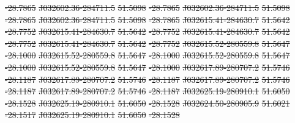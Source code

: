 \documentclass[11pt, a4paper]{book}
\providecommand{\DIFdeltex}[1]{{\protect\color{red}\sout{#1}}}                      %
\providecommand{\DIFdel}[1]{\texorpdfstring{\DIFdeltex{#1}}{}} %
\begin{document}
\DIFdel{-28.7865 }%
\DIFdel{J032602.36-284711.5 }%
\DIFdel{51.5098 }%
\DIFdel{-28.7865 }%
\DIFdel{J032602.36-284711.5 }%
\DIFdel{51.5098 }%
\DIFdel{-28.7865 }%
\DIFdel{J032602.36-284711.5 }%
\DIFdel{51.5098 }%
\DIFdel{-28.7865}%
\DIFdel{J032615.41-284630.7 }%
\DIFdel{51.5642 }%
\DIFdel{-28.7752 }%
\DIFdel{J032615.41-284630.7 }%
\DIFdel{51.5642 }%
\DIFdel{-28.7752 }%
\DIFdel{J032615.41-284630.7 }%
\DIFdel{51.5642 }%
\DIFdel{-28.7752 }%
\DIFdel{J032615.41-284630.7 }%
\DIFdel{51.5642 }%
\DIFdel{-28.7752}%
\DIFdel{J032615.52-280559.8 }%
\DIFdel{51.5647 }%
\DIFdel{-28.1000 }%
\DIFdel{J032615.52-280559.8 }%
\DIFdel{51.5647 }%
\DIFdel{-28.1000 }%
\DIFdel{J032615.52-280559.8 }%
\DIFdel{51.5647 }%
\DIFdel{-28.1000 }%
\DIFdel{J032615.52-280559.8 }%
\DIFdel{51.5647 }%
\DIFdel{-28.1000}%
\DIFdel{J032617.89-280707.2 }%
\DIFdel{51.5746 }%
\DIFdel{-28.1187 }%
\DIFdel{J032617.89-280707.2 }%
\DIFdel{51.5746 }%
\DIFdel{-28.1187 }%
\DIFdel{J032617.89-280707.2 }%
\DIFdel{51.5746 }%
\DIFdel{-28.1187 }%
\DIFdel{J032617.89-280707.2 }%
\DIFdel{51.5746 }%
\DIFdel{-28.1187}%
\DIFdel{J032625.19-280910.1 }%
\DIFdel{51.6050 }%
\DIFdel{-28.1528 }%
\DIFdel{J032625.19-280910.1 }%
\DIFdel{51.6050 }%
\DIFdel{-28.1528 }%
\DIFdel{J032624.50-280905.9 }%
\DIFdel{51.6021 }%
\DIFdel{-28.1517 }%
\DIFdel{J032625.19-280910.1 }%
\DIFdel{51.6050 }%
\DIFdel{-28.1528}%
\end{document}
